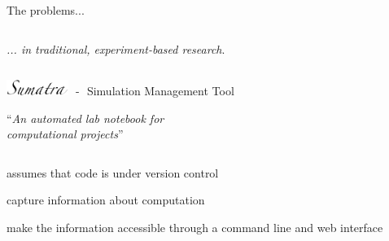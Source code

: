 \documentclass[xcolor=svgnames,11pt]{beamer}
\begin{document}
\begin{frame}{The problems...  }
\begin{columns}
\begin{column}{0.55\textwidth}
      \vspace{-0.72cm}
      \begin{center}
        \textit{... in traditional, experiment-based research}.
      \end{center}
    \end{column}

  \end{columns}

\end{frame}


\begin{frame}{\includegraphics[width=2.0cm]{sumatra_logo_up.png}
     \textcolor{white}{-}- \textcolor{white}{-}Simulation Management
     Tool}

   \large
   \vspace{0.3cm}
   \begin{center}
     \enquote{\textit{An automated lab notebook for\\ computational projects}}
   \end{center}

   \vspace{-0.15cm}
   \begin{center}
   \end{center}

   \vspace{0.2cm}
   \begin{columns}
     \begin{column}{0.58\textwidth}
       \begin{arrowlist}
         \itemsep14pt
         \item<4-> assumes that code is under version control
         \item<5-> capture information about computation
         \item<6-> make the information accessible through a command line
           and web interface
       \end{arrowlist}
       \vspace{1cm}


\end{column}
\end{columns}
\end{frame}
\end{document}
